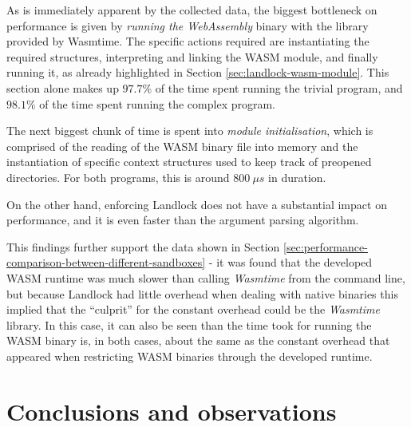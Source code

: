 As is immediately apparent by the collected data, the biggest bottleneck on performance is given
by \textit{running the WebAssembly} binary with the library provided by Wasmtime.
The specific actions required are instantiating the required structures, interpreting and linking the WASM module,
and finally running it, as already highlighted in Section \ref{sec:landlock-wasm-module}.
This section alone makes up $97.7 \%$ of the time spent running the trivial program, and $98.1 \%$ of the time
spent running the complex program.

The next biggest chunk of time is spent into \textit{module initialisation}, which is comprised of the
reading of the WASM binary file into memory and the instantiation of specific context structures used
to keep track of preopened directories. For both programs, this is around $800\ \mu s$ in duration.

On the other hand, enforcing Landlock does not have a substantial impact on performance,
and it is even faster than the argument parsing algorithm.

This findings further support the data shown in Section \ref{sec:performance-comparison-between-different-sandboxes} -
it was found that the developed WASM runtime was much slower than calling \textit{Wasmtime} from the command
line, but because Landlock had little overhead when dealing with native binaries this implied that
the ``culprit'' for the constant overhead could be the \textit{Wasmtime} library.
In this case, it can also be seen than the time took for running the WASM binary is, in both cases, about
the same as the constant overhead that appeared when restricting WASM binaries through the developed runtime.

\section{Conclusions and observations}